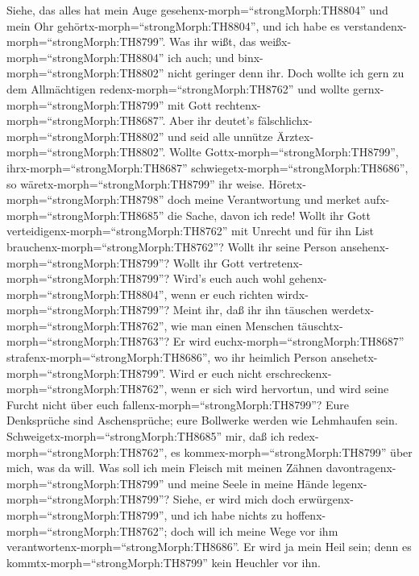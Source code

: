  Siehe, das alles hat mein Auge
gesehenx-morph=``strongMorph:TH8804'' und mein Ohr
gehörtx-morph=``strongMorph:TH8804'', und ich habe es
verstandenx-morph=``strongMorph:TH8799''.  Was ihr wißt, das
weißx-morph=``strongMorph:TH8804'' ich auch; und
binx-morph=``strongMorph:TH8802'' nicht geringer denn ihr. 
Doch wollte ich gern zu dem Allmächtigen
redenx-morph=``strongMorph:TH8762'' und wollte
gernx-morph=``strongMorph:TH8799'' mit Gott
rechtenx-morph=``strongMorph:TH8687''.  Aber ihr deutet's
fälschlichx-morph=``strongMorph:TH8802'' und seid alle unnütze
Ärztex-morph=``strongMorph:TH8802''.  Wollte
Gottx-morph=``strongMorph:TH8799'', ihrx-morph=``strongMorph:TH8687''
schwiegetx-morph=``strongMorph:TH8686'', so
wäretx-morph=``strongMorph:TH8799'' ihr weise. 
Höretx-morph=``strongMorph:TH8798'' doch meine Verantwortung und merket
aufx-morph=``strongMorph:TH8685'' die Sache, davon ich rede!
 Wollt ihr Gott verteidigenx-morph=``strongMorph:TH8762''
mit Unrecht und für ihn List brauchenx-morph=``strongMorph:TH8762''?
 Wollt ihr seine Person
ansehenx-morph=``strongMorph:TH8799''? Wollt ihr Gott
vertretenx-morph=``strongMorph:TH8799''?  Wird's euch auch
wohl gehenx-morph=``strongMorph:TH8804'', wenn er euch richten
wirdx-morph=``strongMorph:TH8799''? Meint ihr, daß ihr ihn täuschen
werdetx-morph=``strongMorph:TH8762'', wie man einen Menschen
täuschtx-morph=``strongMorph:TH8763''?  Er wird
euchx-morph=``strongMorph:TH8687''
strafenx-morph=``strongMorph:TH8686'', wo ihr heimlich Person
ansehetx-morph=``strongMorph:TH8799''.  Wird er euch nicht
erschreckenx-morph=``strongMorph:TH8762'', wenn er sich wird hervortun,
und wird seine Furcht nicht über euch
fallenx-morph=``strongMorph:TH8799''?  Eure Denksprüche
sind Aschensprüche; eure Bollwerke werden wie Lehmhaufen sein.
 Schweigetx-morph=``strongMorph:TH8685'' mir, daß ich
redex-morph=``strongMorph:TH8762'', es
kommex-morph=``strongMorph:TH8799'' über mich, was da will.
 Was soll ich mein Fleisch mit meinen Zähnen
davontragenx-morph=``strongMorph:TH8799'' und meine Seele in meine Hände
legenx-morph=``strongMorph:TH8799''?  Siehe, er wird mich
doch erwürgenx-morph=``strongMorph:TH8799'', und ich habe nichts zu
hoffenx-morph=``strongMorph:TH8762''; doch will ich meine Wege vor ihm
verantwortenx-morph=``strongMorph:TH8686''.  Er wird ja
mein Heil sein; denn es kommtx-morph=``strongMorph:TH8799'' kein
Heuchler vor ihn. 
